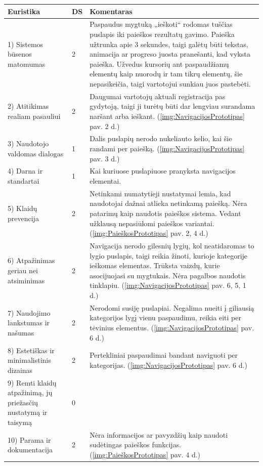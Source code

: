 \documentclass{VUMIFPSkursinis}
\begin{document}
\begin{center}
\begin{tabular}{ | p{} | p{} | p{} | } 
 \hline
	Euristika & DS & Komentaras \\ \hline
	1) Sistemos būsenos matomumas & 2 & Paspaudus mygtuką „ieškoti“ rodomas tuščias puslapis iki paieškos rezultatų gavimo. Paieška užtrunka apie 3 sekundes, taigi galėtų būti tekstas, animacija ar progreso juosta pranešanti, kad vyksta paieška. Užvedus kursorių ant paspaudžiamų elementų kaip nuorodų ir tam tikrų elementų, šie nepasikeičia, taigi vartotojui sunkiau juos pastebėti. \\ \hline
	2) Atitikimas realiam pasauliui  & 2 & Daugumai vartotojų aktuali registracija pas gydytoją, taigi ji turėtų būti dar lengviau surandama naršant arba ieškant. (\ref{img:NavigacijosPrototipas} pav. 2 d.) \\ \hline
	3) Naudotojo valdomas dialogas & 1 & Dalis puslapių nerodo nukeliauto kelio, kai šie randami per paiešką. (\ref{img:NavigacijosPrototipas} pav. 3 d.) \\ \hline
	4) Darna ir standartai & 1 & Kai kuriuose puslapiuose pranyksta navigacijos elementai. \\ \hline
	5) Klaidų prevencija & 2 & Netinkami numatytieji nustatymai lemia, kad naudotojai dažnai atlieka netinkamą paiešką. Nėra patarimų kaip naudotis paieškos sistema. Vedant užklausą nepasiūlomi paieškos variantai. (\ref{img:PaieškosPrototipas} pav. 2, 4 d.) \\ \hline
	6) Atpažinimas geriau nei atsiminimas & 2 & Navigacija nerodo gilesnių lygių, kol neatidaromas to lygio puslapis, taigi reikia žinoti, kurioje kategorije ieškomas elementas. Trūksta vaizdų, kurie asocijuojasi su mygtukais. Nėra pagalbos naudotis tinklapiu. (\ref{img:NavigacijosPrototipas} pav. 6, 5, 1 d.) \\ \hline
	7) Naudojimo lankstumas ir našumas & 2 & Nerodomi susiję puslapiai. Negalima nueiti į giliausią kategorijos lygį vienu paspaudimu, reikia eiti per tėvinius elementus. (\ref{img:NavigacijosPrototipas} pav. 6 d.) \\ \hline
	8) Estetiškas ir minimalistinis dizainas & 2 & Pertekliniai paspaudimai bandant naviguoti per kategorijas. (\ref{img:NavigacijosPrototipas} pav. 6 d.) \\ \hline
	9) Remti klaidų atpažinimą, jų priežasčių nustatymą ir taisymą & 0 &  \\ \hline
	10) Parama ir dokumentacija & 2 & Nėra informacijos ar pavyzdžių kaip naudoti sudėtingas paieškos funkcijas. (\ref{img:PaieškosPrototipas} pav. 4 d.) \\ \hline
\end{tabular}
\label{EuristikųLentelėPrad}
\end{center}
\end{document}
